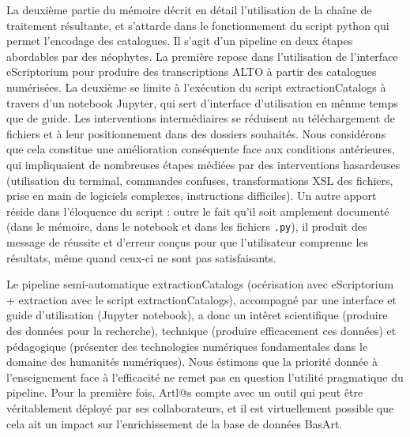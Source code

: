 \documentclass[a4paper,12pt,twoside]{book}
\begin{document}
La deuxième partie du mémoire décrit en détail l'utilisation de la chaîne de traitement résultante, et s'attarde dans le fonctionnement du script python qui permet l'encodage des catalogues. Il s'agit d'un pipeline en deux étapes abordables par des néophytes. La première repose dans l'utilisation de l'interface eScriptorium pour produire des transcriptions ALTO à partir des catalogues numérisées. La deuxième se limite à l'exécution du script extractionCatalogs à travers d'un notebook Jupyter, qui sert d'interface d'utilisation en mênme temps que de guide. Les interventions intermédiaires se réduisent au téléchargement de fichiers et à leur positionnement dans des dossiers souhaités. Nous considérons que cela constitue une amélioration conséquente face aux conditions antérieures, qui impliquaient de nombreuses étapes médiées par des interventions hasardeuses (utilisation du terminal, commandes confuses, transformations XSL des fichiers, prise en main de logiciels complexes, instructions difficiles). Un autre apport réside dans l'éloquence du script : outre le fait qu'il soit amplement documenté (dans le mémoire, dans le notebook et dans les fichiers \texttt{.py}), il produit des message de réussite et d'erreur conçus pour que l'utilisateur comprenne les résultats, même quand ceux-ci ne sont pas satisfaisants.

Le pipeline semi-automatique extractionCatalogs (océrisation avec eScriptorium + extraction avec le script extractionCatalogs), accompagné par une interface et guide d'utilisation (Jupyter notebook), a donc un intêret scientifique (produire des données pour la recherche), technique (produire efficacement ces données) et pédagogique (présenter des technologies numériques fondamentales dans le domaine des humanités numériques). Nous éstimons que la priorité donnée à l'enseignement face à l'efficacité ne remet pas en question l'utilité pragmatique du pipeline. Pour la première fois, Artl@s compte avec un outil qui peut être véritablement déployé par ses collaborateurs, et il est virtuellement possible que cela ait un impact sur l'enrichissement de la base de données BasArt.\\
\end{document}
